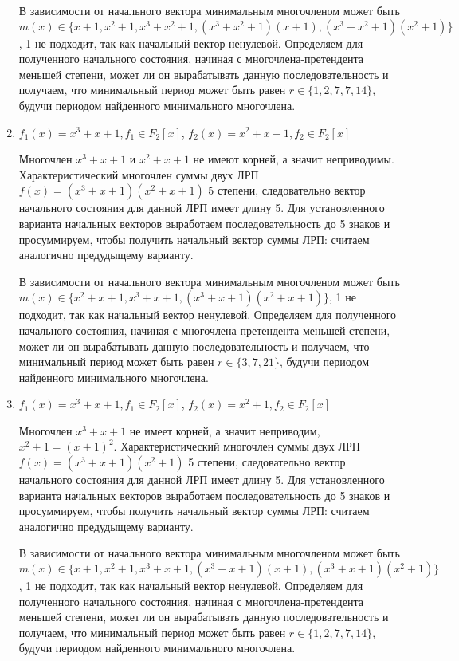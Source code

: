 \documentclass[12pt]{extarticle}
\begin{document}
\begin{enumerate}
     В зависимости от начального вектора минимальным многочленом может быть $m(x)\in\{x+1, x^2+1, x^3+x^2+1, (x^3+x^2+1)(x+1), (x^3+x^2+1)(x^2+1)\}$, 1 не подходит, так как начальный вектор ненулевой. Определяем для полученного начального состояния, начиная с многочлена-претендента меньшей степени, может ли он вырабатывать данную последовательность и получаем, что минимальный период может быть равен $r \in \{1, 2, 7, 7, 14 \}$, будучи периодом найденного минимального многочлена.
     
     \item $f_1(x) = x^3+x+1, f_1\in F_2[x]$, $f_2(x) = x^2+x+1, f_2\in F_2[x]$
    
     Многочлен $x^3+x+1$ и $x^2+x+1$ не имеют корней, а значит неприводимы. Характеристический многочлен суммы двух ЛРП $f(x) = (x^3+x+1)(x^2+x+1)$ 5 степени, следовательно вектор начального состояния для данной ЛРП имеет длину 5. Для установленного варианта начальных векторов выработаем последовательность до 5 знаков и просуммируем, чтобы получить начальный вектор суммы ЛРП: считаем аналогично предудыщему варианту.
     
     В зависимости от начального вектора минимальным многочленом может быть $m(x)\in\{x^2+x+1, x^3+x+1, (x^3+x+1)(x^2+x+1)\}$, 1 не подходит, так как начальный вектор ненулевой. Определяем для полученного начального состояния, начиная с многочлена-претендента меньшей степени, может ли он вырабатывать данную последовательность и получаем, что минимальный период может быть равен $r \in \{3, 7, 21 \}$, будучи периодом найденного минимального многочлена.
     
     \item $f_1(x) = x^3+x+1, f_1\in F_2[x]$, $f_2(x) = x^2+1, f_2\in F_2[x]$
    
     Многочлен $x^3+x+1$ не имеет корней, а значит неприводим, $x^2+1 = (x+1)^2$. Характеристический многочлен суммы двух ЛРП $f(x) = (x^3+x+1)(x^2+1)$ 5 степени, следовательно вектор начального состояния для данной ЛРП имеет длину 5. Для установленного варианта начальных векторов выработаем последовательность до 5 знаков и просуммируем, чтобы получить начальный вектор суммы ЛРП: считаем аналогично предудыщему варианту.
     
     В зависимости от начального вектора минимальным многочленом может быть $m(x)\in\{x+1, x^2+1, x^3+x+1, (x^3+x+1)(x+1), (x^3+x+1)(x^2+1)\}$, 1 не подходит, так как начальный вектор ненулевой. Определяем для полученного начального состояния, начиная с многочлена-претендента меньшей степени, может ли он вырабатывать данную последовательность и получаем, что минимальный период может быть равен $r \in \{1, 2, 7, 7, 14 \}$, будучи периодом найденного минимального многочлена.
\end{enumerate}
\end{document}
